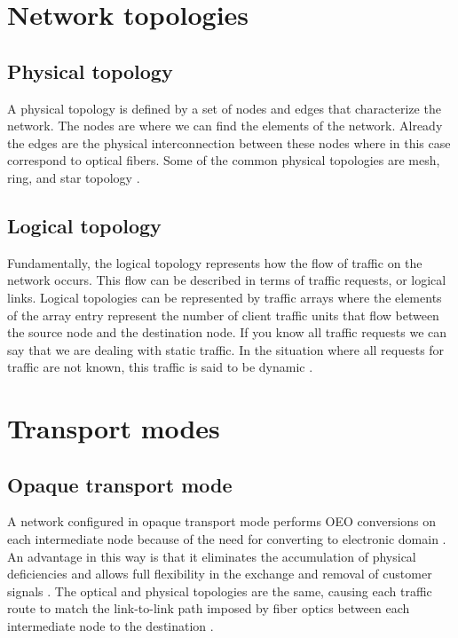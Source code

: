 \section{Network topologies}\label{network_topologies}

\subsection{Physical topology}

A physical topology is defined by a set of nodes and edges that characterize the network. The nodes are where we can find the elements of the network. Already the edges are the physical interconnection between these nodes where in this case correspond to optical fibers.
Some of the common physical topologies are mesh, ring, and star topology \cite{aulas2}\cite{teselisboa}.

\subsection{Logical topology}

Fundamentally, the logical topology represents how the flow of traffic on the network occurs. This flow can be described in terms of traffic requests, or logical links.
Logical topologies can be represented by traffic arrays where the elements of the array entry represent the number of client traffic units that flow between the source node and the destination node.
If you know all traffic requests we can say that we are dealing with static traffic. In the situation where all requests for traffic are not known, this traffic is said to be dynamic \cite{aulas2}\cite{teselisboa}.

\section{Transport modes}\label{transport_mode}

\subsection{Opaque transport mode}\label{opaque}

A network configured in opaque transport mode performs OEO conversions on each intermediate node because of the need for converting to electronic domain \cite{book07}.
An advantage in this way is that it eliminates the accumulation of physical deficiencies and allows full flexibility in the exchange and removal of customer signals \cite{teserui}.
The optical and physical topologies are the same, causing each traffic route to match the link-to-link path imposed by fiber optics between each intermediate node to the destination \cite{tesevasco,opaque}.\\

